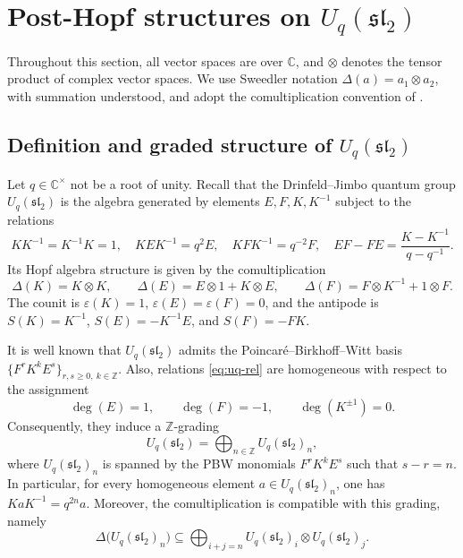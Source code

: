 \documentclass[11pt,english]{article}
\newcommand{\ten}{\otimes}
\newcommand{\Del}{\Delta}
\theoremstyle{definition}
\begin{document}
\section{Post-Hopf structures on $U_q(\mathfrak{sl}_2)$}
Throughout this section, all vector spaces are over $\mathbb{C}$, and $\ten$ denotes the tensor product of complex vector spaces. 
We use Sweedler notation
$\Del(a)=a_1\otimes a_2$,
with summation understood, and adopt the
comultiplication convention of \cite{Jantzen}.
\subsection{Definition and graded structure of $U_q(\mathfrak{sl}_2)$}\label{subsec:uq}
Let $q\in\mathbb{C}^\times$ not be a root of unity.  Recall that the Drinfeld--Jimbo quantum group $U_q(\mathfrak{sl}_2)$
is the algebra generated by elements
$E,F,K,K^{-1}$ subject to the relations
\begin{equation}\label{eq:uq-rel}
KK^{-1}=K^{-1}K=1,\quad KEK^{-1}=q^2E,\quad KFK^{-1}=q^{-2}F,\quad
EF-FE=\frac{K-K^{-1}}{q-q^{-1}}.
\end{equation}
Its Hopf algebra structure is given by the comultiplication
\begin{equation}\label{eq:uq-cop}
\Del(K)=K\otimes K,\qquad
\Del(E)=E\otimes 1+K\otimes E,\qquad
\Del(F)=F\otimes K^{-1}+1\otimes F.
\end{equation}
The counit is $\varepsilon(K)=1$, $\varepsilon(E)= \varepsilon(F)=0$, and the antipode is $S(K)=K^{-1}$, $S(E)=-K^{-1}E$, and $S(F)=-FK$.

It is well known that $U_q(\mathfrak{sl}_2)$ admits the  Poincar\'e--Birkhoff--Witt basis $\{ F^rK^kE^s\}_{r,s\ge0,\ k\in\mathbb{Z}}$.
Also, relations \eqref{eq:uq-rel} are homogeneous with respect to the
assignment
\[
\deg(E)=1,\qquad \deg(F)=-1,\qquad
\deg(K^{\pm1})=0.
\]
Consequently, they induce a $\mathbb{Z}$-grading
\begin{equation}\label{eq:grading}
U_q(\mathfrak{sl}_2)
=\bigoplus_{n\in\mathbb{Z}} U_q(\mathfrak{sl}_2)_n,
\end{equation}
where $U_q(\mathfrak{sl}_2)_n$ is spanned by the
PBW monomials $F^rK^kE^s$ such that $s-r=n$.
In particular, for every homogeneous element
$a\in U_q(\mathfrak{sl}_2)_n$, one has $KaK^{-1}=q^{2n}a$.
Moreover, the comultiplication is compatible with
this grading, namely
\begin{equation}\label{eq:graded-cop}
\Del\bigl(U_q(\mathfrak{sl}_2)_n\bigr)
\subseteq
\bigoplus_{i+j=n}
U_q(\mathfrak{sl}_2)_i
\otimes U_q(\mathfrak{sl}_2)_j.
\end{equation}
\end{document}
